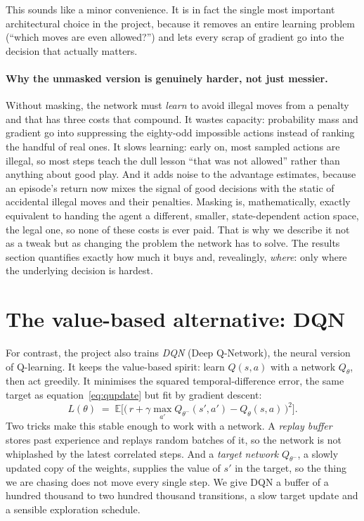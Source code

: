 \documentclass[11pt]{article}
\newcommand{\key}[1]{\textit{#1}}            %
\begin{document}
This sounds like a minor convenience. It is in fact the single most important
architectural choice in the project, because it removes an entire learning problem (``which
moves are even allowed?'') and lets every scrap of gradient go into the decision that
actually matters.

\paragraph{Why the unmasked version is genuinely harder, not just messier.} Without
masking, the network must \emph{learn} to avoid illegal moves from a penalty and that has
three costs that compound. It wastes capacity: probability mass and gradient go into
suppressing the eighty-odd impossible actions instead of ranking the handful of real ones.
It slows learning: early on, most sampled actions are illegal, so most steps teach the dull
lesson ``that was not allowed'' rather than anything about good play. And it adds noise to
the advantage estimates, because an episode's return now mixes the signal of good decisions
with the static of accidental illegal moves and their penalties. Masking is, mathematically,
exactly equivalent to handing the agent a different, smaller, state-dependent action space,
the legal one, so none of these costs is ever paid. That is why we describe it not as a
tweak but as changing the problem the network has to solve. The results section quantifies
exactly how much it buys and, revealingly, \emph{where}: only where the underlying decision
is hardest.

\section{The value-based alternative: DQN}

For contrast, the project also trains \key{DQN} (Deep Q-Network), the neural version of
Q-learning. It keeps the value-based spirit: learn $Q(s,a)$ with a network $Q_\theta$, then
act greedily. It minimises the squared temporal-difference error, the same target as
equation~\eqref{eq:qupdate} but fit by gradient descent:
\begin{equation}
L(\theta)\;=\;\mathbb{E}\Big[\big(\,r+\gamma\max_{a'}Q_{\theta^-}(s',a')-Q_\theta(s,a)\,\big)^2\Big].
\label{eq:dqn}
\end{equation}
Two tricks make this stable enough to work with a network. A \key{replay buffer} stores
past experience and replays random batches of it, so the network is not whiplashed by the
latest correlated steps. And a \key{target network} $Q_{\theta^-}$, a slowly updated copy
of the weights, supplies the value of $s'$ in the target, so the thing we are chasing does
not move every single step. We give DQN a buffer of a hundred thousand to two hundred
thousand transitions, a slow target update and a sensible exploration schedule.
\end{document}
